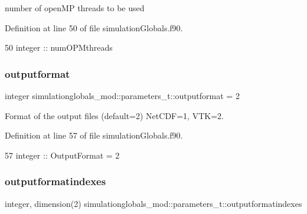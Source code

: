 number of open\+MP threads to be used 



Definition at line 50 of file simulation\+Globals.\+f90.


\begin{DoxyCode}
50         \textcolor{keywordtype}{integer}         :: numOPMthreads
\end{DoxyCode}
\mbox{\label{structsimulationglobals__mod_1_1parameters__t_a455601cb209772820789bdfd696628d2}} 
\subsubsection{\texorpdfstring{outputformat}{outputformat}}
{\footnotesize\ttfamily integer simulationglobals\+\_\+mod\+::parameters\+\_\+t\+::outputformat = 2\hspace{0.3cm}{\ttfamily [private]}}



Format of the output files (default=2) Net\+C\+DF=1, V\+TK=2. 



Definition at line 57 of file simulation\+Globals.\+f90.


\begin{DoxyCode}
57         \textcolor{keywordtype}{integer}         :: OutputFormat = 2
\end{DoxyCode}
\mbox{\label{structsimulationglobals__mod_1_1parameters__t_ac4e90208e4fb5c5fc0a673b03fc908d7}} 
\subsubsection{\texorpdfstring{outputformatindexes}{outputformatindexes}}
{\footnotesize\ttfamily integer, dimension(2) simulationglobals\+\_\+mod\+::parameters\+\_\+t\+::outputformatindexes\hspace{0.3cm}{\ttfamily [private]}}



